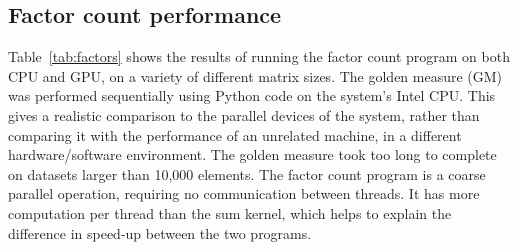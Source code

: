 \begin{table}[h]
\centering
{}
\caption{CPU vs GPU performance on sum kernel}
\label{tab:kernel}

\end{table}







\subsection{Factor count performance}

Table~\ref{tab:factors} shows the results of running the factor count program on both CPU and GPU, on a variety of different matrix sizes. The golden measure (GM) was performed sequentially using Python code on the system's Intel CPU. This gives a realistic comparison to the parallel devices of the system, rather than comparing it with the performance of an unrelated machine, in a different hardware/software environment. The golden measure took too long to complete on datasets larger than 10,000 elements. The factor count program is a coarse parallel operation, requiring no communication between threads. It has more computation per thread than the sum kernel, which helps to explain the difference in speed-up between the two programs.

